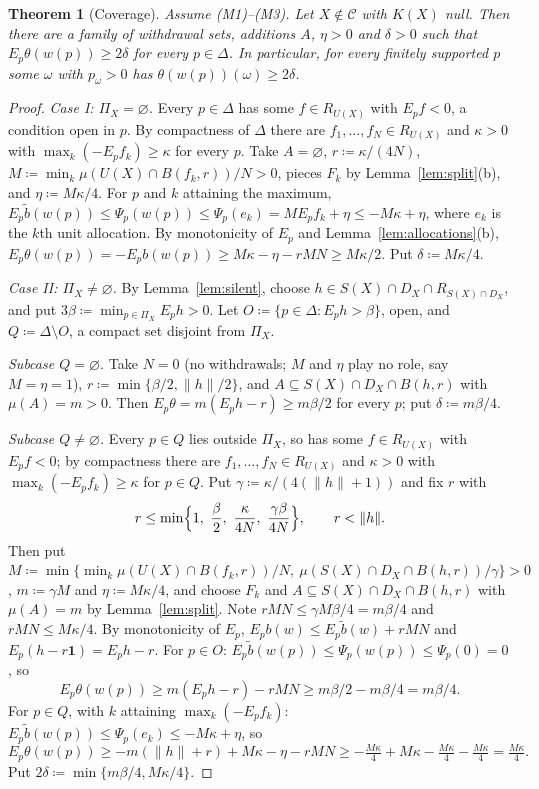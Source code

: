 \documentclass[11pt]{article}
\newtheorem{theorem}{Theorem}[section]
\theoremstyle{definition}
\theoremstyle{remark}
\newcommand{\C}{\mathcal C}
\newcommand{\one}{\mathbf 1}
\begin{document}
\begin{theorem}[Coverage]\label{thm:coverage}
Assume (M1)--(M3). Let $X\notin\C$ with $K(X)$ null. Then there are a family of withdrawal sets, additions $A$, $\eta>0$ and $\delta>0$ such that $E_p\theta(w(p))\ge2\delta$ for every $p\in\Delta$. In particular, for every finitely supported $p$ some $\omega$ with $p_\omega>0$ has $\theta(w(p))(\omega)\ge2\delta$.
\end{theorem}
\begin{proof}
\emph{Case I: $\Pi_X=\varnothing$.} Every $p\in\Delta$ has some $f\in R_{U(X)}$ with $E_pf<0$, a condition open in $p$. By compactness of $\Delta$ there are $f_1,\dots,f_N\in R_{U(X)}$ and $\kappa>0$ with $\max_k(-E_pf_k)\ge\kappa$ for every $p$. Take $A=\varnothing$, $r\coloneqq\kappa/(4N)$, $M\coloneqq\min_k\mu(U(X)\cap B(f_k,r))/N>0$, pieces $F_k$ by Lemma~\ref{lem:split}(b), and $\eta\coloneqq M\kappa/4$. For $p$ and $k$ attaining the maximum, $E_p\tilde b(w(p))\le\Psi_p(w(p))\le\Psi_p(e_k)=ME_pf_k+\eta\le-M\kappa+\eta$, where $e_k$ is the $k$th unit allocation. By monotonicity of $E_p$ and Lemma~\ref{lem:allocations}(b), $E_p\theta(w(p))=-E_pb(w(p))\ge M\kappa-\eta-rMN\ge M\kappa/2$. Put $\delta\coloneqq M\kappa/4$.

\emph{Case II: $\Pi_X\ne\varnothing$.} By Lemma~\ref{lem:silent}, choose $h\in S(X)\cap D_X\cap R_{S(X)\cap D_X}$, and put $3\beta\coloneqq\min_{p\in\Pi_X}E_ph>0$. Let $O\coloneqq\{p\in\Delta:E_ph>\beta\}$, open, and $Q\coloneqq\Delta\setminus O$, a compact set disjoint from $\Pi_X$.

\emph{Subcase $Q=\varnothing$.} Take $N=0$ (no withdrawals; $M$ and $\eta$ play no role, say $M=\eta=1$), $r\coloneqq\min\{\beta/2,\|h\|/2\}$, and $A\subseteq S(X)\cap D_X\cap B(h,r)$ with $\mu(A)=m>0$. Then $E_p\theta=m(E_ph-r)\ge m\beta/2$ for every $p$; put $\delta\coloneqq m\beta/4$.

\emph{Subcase $Q\ne\varnothing$.} Every $p\in Q$ lies outside $\Pi_X$, so has some $f\in R_{U(X)}$ with $E_pf<0$; by compactness there are $f_1,\dots,f_N\in R_{U(X)}$ and $\kappa>0$ with $\max_k(-E_pf_k)\ge\kappa$ for $p\in Q$. Put $\gamma\coloneqq\kappa/(4(\|h\|+1))$ and fix $r$ with
\[
r\le\min\Bigl\{1,\ \frac\beta2,\ \frac{\kappa}{4N},\ \frac{\gamma\beta}{4N}\Bigr\},\qquad r<\|h\|.
\]
Then put $M\coloneqq\min\{\min_k\mu(U(X)\cap B(f_k,r))/N,\ \mu(S(X)\cap D_X\cap B(h,r))/\gamma\}>0$, $m\coloneqq\gamma M$ and $\eta\coloneqq M\kappa/4$, and choose $F_k$ and $A\subseteq S(X)\cap D_X\cap B(h,r)$ with $\mu(A)=m$ by Lemma~\ref{lem:split}. Note $rMN\le\gamma M\beta/4=m\beta/4$ and $rMN\le M\kappa/4$. By monotonicity of $E_p$, $E_pb(w)\le E_p\tilde b(w)+rMN$ and $E_p(h-r\one)=E_ph-r$.
For $p\in O$: $E_p\tilde b(w(p))\le\Psi_p(w(p))\le\Psi_p(0)=0$, so
\[
E_p\theta(w(p))\ge m(E_ph-r)-rMN\ge m\beta/2-m\beta/4=m\beta/4.
\]
For $p\in Q$, with $k$ attaining $\max_k(-E_pf_k)$: $E_p\tilde b(w(p))\le\Psi_p(e_k)\le-M\kappa+\eta$, so
\[
E_p\theta(w(p))\ge-m(\|h\|+r)+M\kappa-\eta-rMN\ge-\tfrac{M\kappa}4+M\kappa-\tfrac{M\kappa}4-\tfrac{M\kappa}4=\tfrac{M\kappa}4.
\]
Put $2\delta\coloneqq\min\{m\beta/4,M\kappa/4\}$.


\end{proof}
\end{document}
